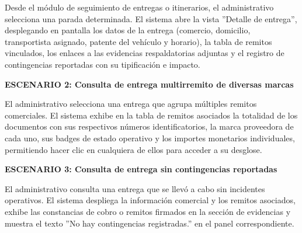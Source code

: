 \documentclass[a4paper,9pt]{article}
\begin{document}
\begin{tcolorbox}[hucard, title={\textbf{HU-18: CONSULTAR DETALLE DE ENTREGA} \hfill \scriptsize \colorbox{bluestatus}{\textbf{\ New\ }} \quad \colorbox{white}{\textcolor{primarydark}{\textbf{\ 2 pts\ }}}}]
{Desde el módulo de seguimiento de entregas o itinerarios, el administrativo selecciona una parada determinada. El sistema abre la vista ''Detalle de entrega'', desplegando en pantalla los datos de la entrega (comercio, domicilio, transportista asignado, patente del vehículo y horario), la tabla de remitos vinculados, los enlaces a las evidencias respaldatorias adjuntas y el registro de contingencias reportadas con su tipificación e impacto.\par\vspace{2.5pt}
\noindent\textbf{\textcolor{secondarydark}{ESCENARIO 2:  Consulta de entrega multirremito de diversas marcas}}\par\vspace{1pt}
El administrativo selecciona una entrega que agrupa múltiples remitos comerciales. El sistema exhibe en la tabla de remitos asociados la totalidad de los documentos con sus respectivos números identificatorios, la marca proveedora de cada uno, sus badges de estado operativo y los importes monetarios individuales, permitiendo hacer clic en cualquiera de ellos para acceder a su desglose.\par\vspace{2.5pt}
\noindent\textbf{\textcolor{secondarydark}{ESCENARIO 3:  Consulta de entrega sin contingencias reportadas}}\par\vspace{1pt}
El administrativo consulta una entrega que se llevó a cabo sin incidentes operativos. El sistema despliega la información comercial y los remitos asociados, exhibe las constancias de cobro o remitos firmados en la sección de evidencias y muestra el texto ''No hay contingencias registradas.'' en el panel correspondiente.\par\vspace{2.5pt}
}\par
\end{tcolorbox}
\end{document}
